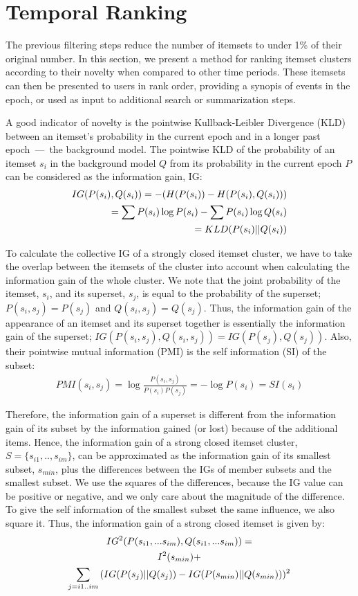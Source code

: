\documentclass{sig-alternate}
\begin{document}
\section{Temporal Ranking}
\label{sec:rank}
The previous filtering steps reduce the number of itemsets to under 1\% of their
original number.
In this section, we present a method for ranking itemset clusters according to
their novelty when compared to other time periods.
These itemsets can then be presented to users in rank order, providing a
synopis of events in the epoch, or used as input to additional search or
summarization steps.

A good indicator of novelty is the pointwise Kullback-Leibler Divergence (KLD)
between an itemset's probability in the current epoch and in a longer past
epoch~---~the background model.
The pointwise KLD of the probability of an itemset $s_i$ in the background
model $Q$ from its probability in the current epoch $P$ can be considered as
the information gain, IG: 
\begin{align}IG(P(s_i),Q(s_i))  = - (H(P(s_i)) - H(P(s_i),Q(s_i))) \notag\\ = \sum{P(s_i) \log{P(s_i)}} - \sum{P(s_i) \log{Q(s_i)}} \notag\\ = KLD(P(s_i)||Q(s_i))\end{align}

To calculate the collective IG of a strongly closed itemset cluster,
we have to take the overlap between the itemsets of the cluster into account
when calculating the information gain of the whole cluster.
We note that the joint probability of the itemset, $s_i$, and its superset,
$s_j$, is equal to the probability of the superset;
$P(s_i,s_j) = P(s_j)$ and $Q(s_i,s_j) = Q(s_j)$. 
Thus, the information gain of the appearance of an itemset and its superset
together is essentially the information gain of the superset;
$IG(P(s_i,s_j),Q(s_i,s_j)) = IG(P(s_j),Q(s_j))$.
Also, their pointwise mutual information (PMI) is the self information (SI) of
the subset:
\begin{align}
PMI(s_i, s_j) = \log{ \frac{P(s_i,s_j)}{P(s_i)P(s_j)} } = -\log{P(s_i)} = SI(s_i)
\end{align}

Therefore, the information gain of a superset is different from the
information gain of its subset by the information gained (or lost) because
of the additional items.
Hence, the information gain of a strong closed itemset cluster,
$S=\{s_{i1},..,s_{im}\}$, 
can be approximated as the information gain of its smallest subset, $s_{min}$,
plus the differences between the IGs of member subsets and the smallest subset.
We use the squares of the differences, because the IG value can be positive or
negative, and we only care about the magnitude of the difference.
To give the self information of the smallest subset the same influence,
we also square it.
Thus, the information gain of a strong closed itemset is given by:
\begin{multline}IG^2(P(s_{i1},...s_{im}),Q(s_{i1},...s_{im})) =\notag\\ I^2(s_{min}) + \notag\\ 
\sum_{j = i1..im}{(IG(P(s_j)||Q(s_j)) - IG(P(s_{min})||Q(s_{min})))^{2}} \end{multline}
\end{document}
